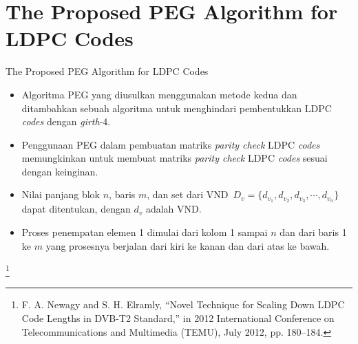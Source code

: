 \documentclass[11pt, aspectratio=169]{beamer}
\newcommand\blfootnote[1]{%
  \begingroup
  \renewcommand\thefootnote{}\footnote{#1}%
  \addtocounter{footnote}{-1}%
  \endgroup
}
\begin{document}
\section{The Proposed PEG Algorithm for LDPC Codes}
\begin{frame}{The Proposed PEG Algorithm for LDPC Codes}
\begin{itemize}
\item Algoritma PEG yang diusulkan menggunakan metode kedua dan ditambahkan sebuah algoritma untuk menghindari pembentukkan LDPC \textit{codes} dengan \textit{girth}-4.
\item Penggunaan PEG dalam pembuatan matriks \textit{parity check} LDPC \textit{codes} memungkinkan untuk membuat matriks \textit{parity check} LDPC \textit{codes} sesuai dengan keinginan.
\item Nilai panjang blok $n$, baris $m$, dan set dari VND~$D_v=\{ d_{v_1}, d_{v_2}, d_{v_3}, \cdots ,d_{v_n} \}$ dapat ditentukan, dengan $d_v$ adalah VND.
\item Proses penempatan elemen 1 dimulai dari kolom 1 sampai $n$ dan dari baris 1 ke $m$ yang prosesnya berjalan dari kiri ke kanan dan dari atas ke bawah.
\end{itemize}
\blfootnote{\tiny{F. A. Newagy and S. H. Elramly, “Novel Technique for Scaling Down LDPC Code Lengths in DVB-T2 Standard,” in 2012 International Conference on Telecommunications and Multimedia (TEMU), July 2012, pp. 180–184.}}
\end{frame}
\end{document}
